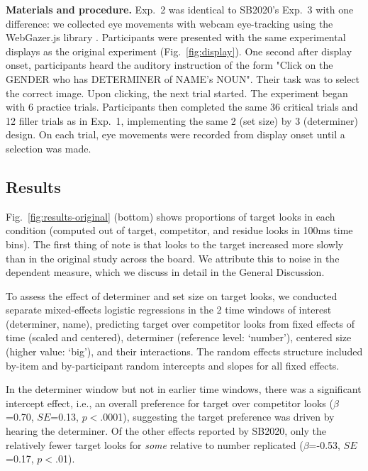 \documentclass[10pt,letterpaper]{article}
\newcommand{\figref}[1]{Fig.~\ref{#1}}
\newcommand{\expref}[1]{Exp.~#1}
\begin{document}
\textbf{Materials and procedure.} \expref{2} was identical to SB2020's \expref{3} with one difference: we collected eye movements with webcam eye-tracking using the WebGazer.js library \cite{papoutsaki2016webgazer}. Participants were presented with the same experimental displays as the original experiment (\figref{fig:display}). One second after display onset, participants heard the auditory instruction of the form "Click on the GENDER who has DETERMINER of NAME's NOUN". Their task was to select the correct image. Upon clicking, the next trial started. The experiment began with 6 practice trials. Participants then completed the same 36 critical trials and 12 filler trials as in \expref{1}, implementing the same 2 (set size) by 3 (determiner) design.  On each trial, eye movements were recorded from display onset until a selection was made.


\subsection{Results}

\figref{fig:results-original} (bottom) shows proportions of target looks in each condition (computed out of target, competitor, and residue looks in 100ms time bins). The first thing of note is that looks to the target increased more slowly than in the original study across the board. We attribute this to noise in the dependent measure, which we discuss in detail in the General Discussion.

To assess the effect of determiner and set size on target looks, we conducted separate mixed-effects logistic regressions in the 2 time windows of interest (determiner, name), predicting target over competitor looks from fixed effects of time (scaled and centered), determiner (reference level: `number'), centered size (higher value: `big'), and their interactions. The random effects structure included by-item and by-participant random intercepts and slopes for all  fixed effects.

In the determiner window but not in earlier time windows, there was a significant intercept effect, i.e., an overall preference for target over competitor looks ($\beta$=0.70, $SE$=0.13, $p<$.0001), suggesting the target preference was driven by hearing the determiner. Of the other effects reported by SB2020, only the relatively fewer target looks for \emph{some} relative to number replicated  ($\beta$=-0.53, $SE$=0.17, $p<$.01).
\end{document}
